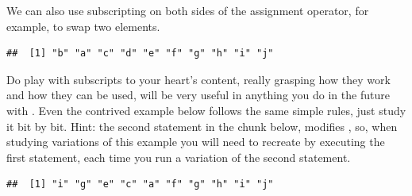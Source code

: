 \documentclass[krantz2]{krantz}\usepackage{knitr}
\begin{document}
We can also use subscripting on both sides of the assignment operator, for example, to swap two elements.

\begin{knitrout}\footnotesize
{}\color{fgcolor}\begin{kframe}
\begin{alltt}
 \hlkwb{<-} \hlstd{letters[}\hlopt{:}\hlstd{]}
\hlstd{a[}\hlopt{:}\hlstd{]} \hlkwb{<-} \hlstd{a[}\hlopt{:}\hlstd{]}
\end{alltt}
\begin{verbatim}
##  [1] "b" "a" "c" "d" "e" "f" "g" "h" "i" "j"
\end{verbatim}
\end{kframe}
\end{knitrout}

\begin{playground}
Do play with subscripts to your heart's content, really grasping how they work and how they can be used, will be very useful in anything you do in the future with \Rlang. Even the contrived example below follows the same simple rules, just study it bit by bit. Hint: the second statement in the chunk below, modifies , so, when studying variations of this example you will need to recreate  by executing the first statement, each time you run a variation of the second statement.

\begin{knitrout}\footnotesize
{}\color{fgcolor}\begin{kframe}
\begin{alltt}
 \hlkwb{<-} \hlstd{letters[}\hlopt{:}\hlstd{]}
\hlstd{a[}\hlopt{:}\hlstd{]} \hlkwb{<-} \hlstd{a[}\hlstd{(}\hlstd{,}\hlstd{)]}
\end{alltt}
\begin{verbatim}
##  [1] "i" "g" "e" "c" "a" "f" "g" "h" "i" "j"
\end{verbatim}
\end{kframe}
\end{knitrout}

\end{playground}
\end{document}
